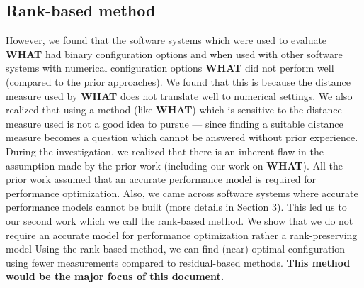 \documentclass[sigconf]{acmart}
\begin{document}
\subsection{Rank-based method}
However, we found that the software systems which were used to evaluate \textbf{WHAT} had binary configuration options and when used with other software systems with numerical configuration options \textbf{WHAT} did not perform well (compared to the prior approaches). We found that this is because the distance measure used by \textbf{WHAT} does not translate well to numerical settings. We also realized that using a method (like \textbf{WHAT}) which is sensitive to the distance measure used is not a good idea to pursue --- since finding a suitable distance measure becomes a question which cannot be answered without prior experience. 
During the investigation, we realized that there is an inherent flaw in the assumption made by the prior work (including our work on \textbf{WHAT}). All the prior work assumed that an accurate performance model is required for performance optimization. Also, we came across software systems where accurate performance models cannot be built (more details in Section 3). This led us to our second work which we call the rank-based method. We show that we do not require an accurate model for performance optimization rather a rank-preserving model Using the rank-based method, we can find (near) optimal configuration using fewer measurements compared to residual-based methods. \textbf{This method would be the major focus of this document.}
\end{document}
